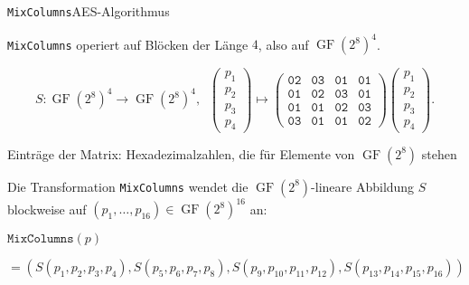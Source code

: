 \documentclass{beamer}
\newcommand{\GF}{\operatorname{GF}}
\theoremstyle{plain}
\begin{document}
 \begin{frame}{\texttt{MixColumns}}{AES-Algorithmus}
 \begin{block}{}
 \texttt{MixColumns} operiert auf Blöcken der Länge $4$, also auf $\GF(2^8)^4$. 
 \end{block}
\[S: \GF(2^8)^4 \rightarrow \GF(2^8)^4, \;\; \begin{pmatrix}
                                              p_1 \\
                                              p_2 \\
                                              p_3 \\
                                              p_4 
                                             \end{pmatrix}
 \mapsto \begin{pmatrix}
              \texttt{02} & \texttt{03} & \texttt{01} & \texttt{01} \\
              \texttt{01} & \texttt{02} & \texttt{03} & \texttt{01} \\
              \texttt{01} & \texttt{01} & \texttt{02} & \texttt{03} \\
              \texttt{03} & \texttt{01} & \texttt{01} & \texttt{02}
             \end{pmatrix} 
             \begin{pmatrix}
              p_1 \\
              p_2 \\
              p_3 \\
              p_4
             \end{pmatrix}.
\]

\begin{center}
\begin{footnotesize}
Einträge der Matrix: Hexadezimalzahlen, die für Elemente von $\GF(2^8)$ stehen  
\end{footnotesize}
\end{center}

\begin{block}{}
Die Transformation \texttt{MixColumns} wendet die $\GF(2^8)$-lineare Abbildung $S$ blockweise auf $(p_1, \dots, p_{16}) \in \GF(2^8)^{16}$ an:
\medskip

\begin{small}
$\texttt{MixColumns}(p)$

$= \left(S(p_1, p_2, p_3, p_4), S(p_5, p_6, p_7, p_8), S(p_9, p_{10}, p_{11}, p_{12}), S(p_{13}, p_{14}, p_{15}, p_{16})\right)$
\end{small}
\end{block}
 \end{frame}
 
\end{document}
